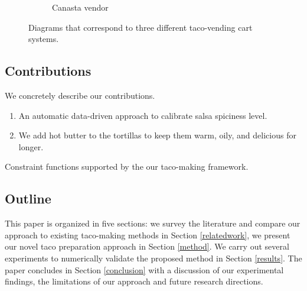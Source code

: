 \begin{figure}[t]
\begin{subfigure}[b]{0.37\textwidth}
            \caption{Canasta vendor}
            \label{fig:self_stressed_wrong}
        \end{subfigure}
        \hspace{-2.0cm}
    
    \caption{Diagrams that correspond to three different taco-vending cart systems.}
    \label{fig:diagrams}
\end{figure}

\subsection{Contributions}

We concretely describe our contributions.
\begin{enumerate}
    \itemsep 0em
    \item An automatic data-driven approach to calibrate salsa spiciness level.
    \item We add hot butter to the tortillas to keep them warm, oily, and delicious for longer.
  \end{enumerate}

\begin{table}[!b]
    \centering
    
    \caption{Constraint functions supported by the our taco-making framework.}
    \label{constraints_table}
\end{table}

\subsection{Outline}
\label{outline}

This paper is organized in five sections: we survey the literature and compare our approach to existing taco-making methods in Section \ref{relatedwork}, we present our novel taco preparation approach in Section \ref{method}.
We carry out several experiments to numerically validate the proposed method in Section \ref{results}.
The paper concludes in Section \ref{conclusion} with a discussion of our experimental findings, the limitations of our approach and future research directions.